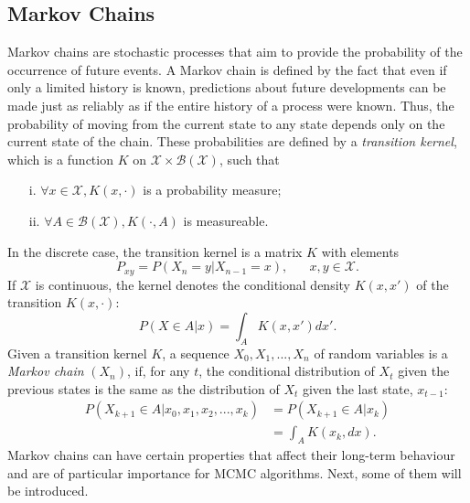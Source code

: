 \documentclass[12pt]{book}
\begin{document}
\subsection{Markov Chains}
Markov chains are stochastic processes that aim to provide the probability of the occurrence of future events. A Markov chain is defined by the fact that even if only a limited history is known, predictions about future developments can be made just as reliably as if the entire history of a process were known. Thus, the probability of moving from the current state to any state depends only on the current state of the chain. These probabilities are defined by a \textit{transition kernel}, which is a function $K$ on $\mathcal{X} \times \mathcal{B}\left(\mathcal{X}\right)$, such that
\begin{itemize}
    \item[i.] $\forall x\in\mathcal{X}, K\left(x, \cdot\right)$ is a probability measure;
    \item[ii.] $\forall A\in \mathcal{B}\left(\mathcal{X}\right), K\left(\cdot, A\right)$ is measureable.
\end{itemize}
In the discrete case, the transition kernel is a matrix $K$ with elements
\begin{equation*}
    P_{xy}=P\left(X_n=y|X_{n-1}=x\right), \hspace{20pt}x,y\in\mathcal{X}.
\end{equation*}
If $\mathcal{X}$ is continuous, the kernel denotes the conditional density $K\left(x,x'\right)$ of the transition $K\left(x,\cdot\right)$:
\begin{equation*}
    P\left(X\in A|x\right)=\int_AK\left(x,x'\right)dx'.
\end{equation*}
Given a transition kernel $K$, a sequence $X_0,X_1,...,X_n$ of random variables is a \textit{Markov chain} $\left(X_n\right)$, if, for any $t$, the conditional distribution of $X_t$ given the previous states is the same as the distribution of $X_t$ given the last state, $x_{t-1}$:
\begin{align}
    P\left(X_{k+1}\in A|x_0,x_1,x_2,...,x_k\right) &= P\left(X_{k+1}\in A|x_k\right) \nonumber\\
    &= \int_A K\left(x_k, dx\right). 
\end{align}
Markov chains can have certain properties that affect their long-term behaviour and are of particular importance for MCMC algorithms. Next, some of them will be introduced.
\end{document}
